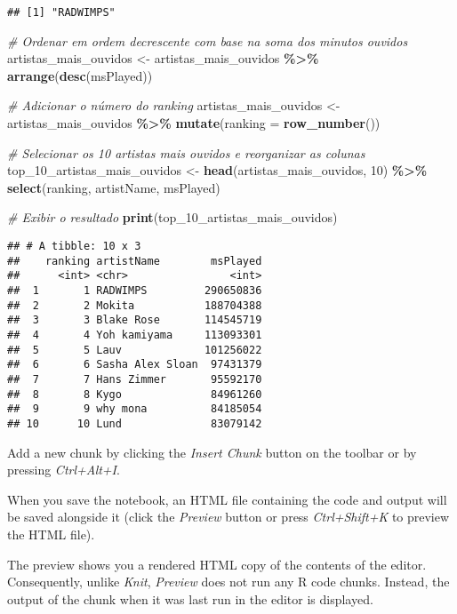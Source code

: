 \documentclass[
]{article}
\newenvironment{Shaded}{\begin{snugshade}}{\end{snugshade}}
\newcommand{\AttributeTok}[1]{\textcolor[rgb]{0.13,0.29,0.53}{#1}}
\newcommand{\CommentTok}[1]{\textcolor[rgb]{0.56,0.35,0.01}{\textit{#1}}}
\newcommand{\DecValTok}[1]{\textcolor[rgb]{0.00,0.00,0.81}{#1}}
\newcommand{\FunctionTok}[1]{\textcolor[rgb]{0.13,0.29,0.53}{\textbf{#1}}}
\newcommand{\NormalTok}[1]{#1}
\newcommand{\OtherTok}[1]{\textcolor[rgb]{0.56,0.35,0.01}{#1}}
\newcommand{\SpecialCharTok}[1]{\textcolor[rgb]{0.81,0.36,0.00}{\textbf{#1}}}
\begin{document}
\begin{verbatim}
## [1] "RADWIMPS"
\end{verbatim}

\begin{Shaded}
\begin{Highlighting}[]
\CommentTok{\# Ordenar em ordem decrescente com base na soma dos minutos ouvidos}
\NormalTok{artistas\_mais\_ouvidos }\OtherTok{\textless{}{-}}\NormalTok{ artistas\_mais\_ouvidos }\SpecialCharTok{\%\textgreater{}\%}
  \FunctionTok{arrange}\NormalTok{(}\FunctionTok{desc}\NormalTok{(msPlayed))}

\CommentTok{\# Adicionar o número do ranking}
\NormalTok{artistas\_mais\_ouvidos }\OtherTok{\textless{}{-}}\NormalTok{ artistas\_mais\_ouvidos }\SpecialCharTok{\%\textgreater{}\%}
  \FunctionTok{mutate}\NormalTok{(}\AttributeTok{ranking =} \FunctionTok{row\_number}\NormalTok{())}

\CommentTok{\# Selecionar os 10 artistas mais ouvidos e reorganizar as colunas}
\NormalTok{top\_10\_artistas\_mais\_ouvidos }\OtherTok{\textless{}{-}} \FunctionTok{head}\NormalTok{(artistas\_mais\_ouvidos, }\DecValTok{10}\NormalTok{) }\SpecialCharTok{\%\textgreater{}\%}
  \FunctionTok{select}\NormalTok{(ranking, artistName, msPlayed)}

\CommentTok{\# Exibir o resultado}
\FunctionTok{print}\NormalTok{(top\_10\_artistas\_mais\_ouvidos)}
\end{Highlighting}
\end{Shaded}

\begin{verbatim}
## # A tibble: 10 x 3
##    ranking artistName        msPlayed
##      <int> <chr>                <int>
##  1       1 RADWIMPS         290650836
##  2       2 Mokita           188704388
##  3       3 Blake Rose       114545719
##  4       4 Yoh kamiyama     113093301
##  5       5 Lauv             101256022
##  6       6 Sasha Alex Sloan  97431379
##  7       7 Hans Zimmer       95592170
##  8       8 Kygo              84961260
##  9       9 why mona          84185054
## 10      10 Lund              83079142
\end{verbatim}

Add a new chunk by clicking the \emph{Insert Chunk} button on the
toolbar or by pressing \emph{Ctrl+Alt+I}.

When you save the notebook, an HTML file containing the code and output
will be saved alongside it (click the \emph{Preview} button or press
\emph{Ctrl+Shift+K} to preview the HTML file).

The preview shows you a rendered HTML copy of the contents of the
editor. Consequently, unlike \emph{Knit}, \emph{Preview} does not run
any R code chunks. Instead, the output of the chunk when it was last run
in the editor is displayed.
\end{document}
